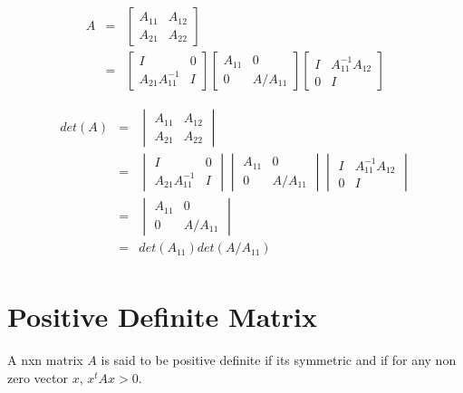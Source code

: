 \begin{eqnarray*}
A & = &\begin{bmatrix} A_{11} & A_{12}\\ A_{21} & A_{22} \end{bmatrix} \\
  & = & \begin{bmatrix} I & 0\\ A_{21}A^{-1}_{11} & I \end{bmatrix} \begin{bmatrix} A_{11} & 0\\ 0 & A/A_{11} \end{bmatrix}
        \begin{bmatrix} I&A^{-1}_{11}A_{12}\\ 0&I \end{bmatrix}
\end{eqnarray*}

             


\begin{eqnarray*}
det(A) & = & \begin {vmatrix} A_{11}&A_{12}\\ A_{21}&A_{22}\end{vmatrix}\\
       & = & \begin{vmatrix} I&0\\ A_{21}A^{-1}_{11}&I \end{vmatrix} \begin{vmatrix} A_{11}&0\\ 0&A/A_{11}\end{vmatrix}
              \begin{vmatrix}I&A^{-1}_{11}A_{12}\\0&I\end{vmatrix}\\
       & = & \begin{vmatrix}A_{11}&0\\ 0&A/A_{11}\end{vmatrix}\\
       & = & det(A_{11})det(A/A_{11})\\
\end{eqnarray*}


\section{Positive Definite Matrix}
\begin{definition}
A nxn  matrix $A$ is said to be positive definite if its symmetric and if for any non zero vector $x$, $ x^{t}Ax > 0 $.
\end{definition}

